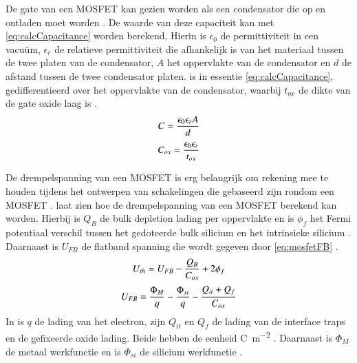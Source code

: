 De gate van een MOSFET kan gezien worden als een condensator die op en ontladen moet worden \cite{DonaldNeamenSemiconductorPhysicsAndDevicesBasicPrinciples}. De waarde van deze capaciteit kan met \cref{eq:calcCapacitance} worden berekend. Hierin is $\epsilon_0$ de permittiviteit in een vacuüm, $\epsilon_r$ de relatieve permittiviteit die afhankelijk is van het materiaal tussen de twee platen van de condensator, $A$ het oppervlakte van de condensator en $d$ de afstand tussen de twee condensator platen.  is in essentie \cref{eq:calcCapacitance}, gedifferentieerd over het oppervlakte van de condensator, waarbij $t_{ox}$ de dikte van de gate oxide laag is \cite{DonaldNeamenSemiconductorPhysicsAndDevicesBasicPrinciples}.
\begin{equation} \label{eq:calcCapacitance}
    C=\frac{\epsilon_0\epsilon_rA}{d}
    \tagaddtext{[\si{\farad}]}
\end{equation}
\begin{equation}\label{eq:calcCox}
    C_{ox}=\frac{\epsilon_0\epsilon_r}{t_{ox}}
    \tagaddtext{[\si{\farad\,\meter^{-2}}]}
\end{equation}

De drempelspanning van een MOSFET is erg belangrijk om rekening mee te houden tijdens het ontwerpen van schakelingen die gebaseerd zijn rondom een MOSFET \cite{inleidingInDeElektronicaWissenburgh,DonaldNeamenSemiconductorPhysicsAndDevicesBasicPrinciples,verhoeven2007structured}.  laat zien hoe de drempelspanning van een MOSFET berekend kan worden. Hierbij is $Q_B$ de bulk depletion lading per oppervlakte en is $\phi_f$ het Fermi potentiaal verschil tussen het gedoteerde bulk silicium en het intrinsieke silicium \cite{bergveld1985impactOfMosfetBasedSensors}. Daarnaast is $U_{FB}$ de flatband spanning die wordt gegeven door \cref{eq:mosfetFB} \cite{bergveld1985impactOfMosfetBasedSensors,isfetAsAnElectronicDevice,DonaldNeamenSemiconductorPhysicsAndDevicesBasicPrinciples,bergveld2003thirtyYearsISFET}.
\begin{equation} \label{eq:mosfetUth}
    U_{th}=U_{FB}-\frac{Q_B}{C_{ox}}+2\phi_f
    \tagaddtext{[\si{\volt}]}
\end{equation}
\begin{equation} \label{eq:mosfetFB}
    U_{FB}=\frac{\Phi_M}{q}-\frac{\Phi_{si}}{q}-\frac{Q_{it}+Q_f}{C_{ox}}
    \tagaddtext{[\si{\volt}]}
\end{equation}
In  is $q$ de lading van het electron, zijn $Q_{it}$ en $Q_f$ de lading van de interface traps en de gefixeerde oxide lading. Beide hebben de eenheid \unit{\coulomb\per\square\meter} \cite{bergveld1985impactOfMosfetBasedSensors}. Daarnaast is $\Phi_M$ de metaal werkfunctie en is $\Phi_{si}$ de silicium werkfunctie \cite{bergveld1985impactOfMosfetBasedSensors,bergveld2003thirtyYearsISFET}.

